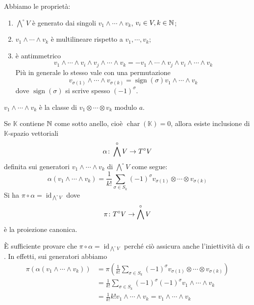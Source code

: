 \documentclass[a4paper]{article}
\begin{document}
Abbiamo le proprietà:
\begin{enumerate}
    \item \(\bigwedge^\circ V\) è generato dai singoli
    \(v_1 \wedge \cdots \wedge v_k\), \(v_i \in V, k \in \mathbb{N}\);
    \item \(v_1 \wedge \cdots \wedge v_k\) è multilineare
    rispetto a \(v_1, \cdots, v_k\);
    \item è antimmetrico \[
        v_1 \wedge \cdots \wedge v_i \wedge v_j \wedge \cdots \wedge v_k
        = - v_1 \wedge \cdots \wedge v_j \wedge v_i \wedge \cdots \wedge v_k
    \]
    Più in generale lo stesso vale con una permutazione
    \[
        v_{\sigma(1)}
        \wedge \cdots \wedge v_{\sigma(k)}
        = \operatorname{sign}(\sigma) v_1 \wedge \cdots \wedge v_k
    \]
    dove \(\operatorname{sign}(\sigma)\) si scrive spesso \((-1)^\sigma\).
\end{enumerate}
\(v_1 \wedge \cdots \wedge v_k\)
è la classe di \(v_1 \otimes \cdots \otimes v_k\)
modulo \(a\).

\begin{snippetproposition}{}
    Se \(\mathbb K\) contiene \(\mathbb{N}\)
    come sotto anello, cioè \(\operatorname{char}(\mathbb K) = 0\),
    allora esiste inclusione di \(\mathbb K\)-spazio vettoriali
    \[
        \alpha \colon \bigwedge^\circ V \to
        T^\circ V
    \]
    definita sui generatori \(v_1 \wedge \cdots \wedge v_k\)
    di \(\bigwedge^\circ V\) come segue:
    \[
        \alpha(v_1 \wedge \cdots \wedge v_k)
        = \frac{1}{k!} \sum_{\sigma \in S_k} (-1)^\sigma v_{\sigma(1)}
        \otimes \cdots \otimes v_{\sigma(k)}
    \]
    Si ha \(\pi \circ \alpha = \operatorname{id}_{\bigwedge^\circ V}\)
    dove \[
        \pi \colon T^\circ V \to \bigwedge^\circ V
    \]
    è la proiezione canonica.
\end{snippetproposition}

\begin{snippetproof}{}
    È sufficiente provare che \(\pi \circ \alpha = \operatorname{id}_{\bigwedge^\circ V}\)
    perché ciò assicura anche l'iniettività di \(\alpha\).
    In effetti, sui generatori abbiamo
    \begin{align*}
        \pi\left(
            \alpha(v_1 \wedge \cdots \wedge v_k)
        \right) &= \pi\left(
            \frac{1}{k!} \sum_{\sigma \in S_k}
            (-1)^\sigma v_{\sigma(1)} \otimes \cdots \otimes v_{\sigma(k)}
        \right) \\
        &= \frac{1}{k!} \sum_{\sigma \in S_k}
        (-1)^\sigma (-1)^\sigma v_1 \wedge \cdots \wedge v_k \\
        &= \frac{1}{k!} k! v_1 \wedge \cdots \wedge v_k
        = v_1 \wedge \cdots \wedge v_k 
    \end{align*}
\end{snippetproof}
\end{document}
